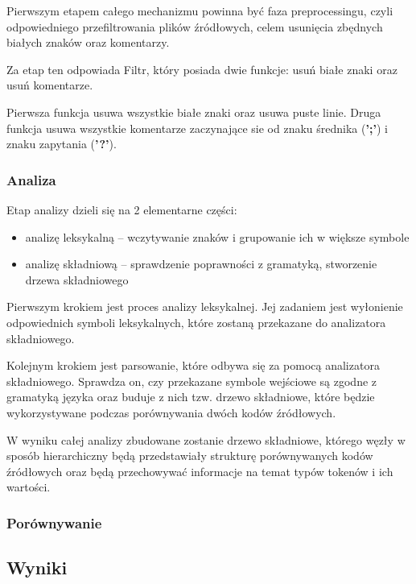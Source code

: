 \documentclass[a4paper,12pt]{article}
\begin{document}
Pierwszym etapem całego mechanizmu powinna być faza preprocessingu, czyli odpowiedniego przefiltrowania plików źródłowych, celem usunięcia zbędnych białych znaków oraz komentarzy.

Za etap ten odpowiada Filtr, który posiada dwie funkcje: usuń białe znaki oraz usuń komentarze.

Pierwsza funkcja usuwa wszystkie białe znaki oraz usuwa puste linie. Druga funkcja usuwa wszystkie komentarze zaczynające sie od znaku średnika (\textbf{';'}) i znaku zapytania (\textbf{'?'}).

\subsubsection{Analiza}

Etap analizy dzieli się na 2 elementarne części:
\begin{itemize}
\item analizę leksykalną – wczytywanie znaków i grupowanie ich w większe symbole
\item analizę składniową – sprawdzenie poprawności z gramatyką, stworzenie drzewa składniowego 
\end{itemize}

Pierwszym krokiem jest proces analizy leksykalnej. Jej zadaniem jest wyłonienie odpowiednich symboli leksykalnych, które zostaną przekazane do analizatora składniowego.

Kolejnym krokiem jest parsowanie, które odbywa się za pomocą analizatora składniowego. Sprawdza on, czy przekazane symbole wejściowe są zgodne z gramatyką języka oraz buduje z nich tzw. drzewo składniowe, które będzie wykorzystywane podczas porównywania dwóch kodów źródłowych.

W wyniku całej analizy zbudowane zostanie drzewo składniowe, którego węzły w sposób hierarchiczny będą przedstawiały strukturę porównywanych kodów źródłowych oraz będą przechowywać informacje na temat typów tokenów i ich wartości.

\subsubsection{Porównywanie}

\newpage

\subsection{Wyniki}

\newpage
\end{document}
